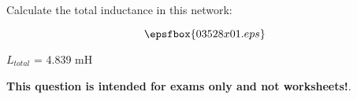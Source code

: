 

Calculate the total inductance in this network:

$$\epsfbox{03528x01.eps}$$







$L_{total}$ = 4.839 mH







{\bf This question is intended for exams only and not worksheets!}.



